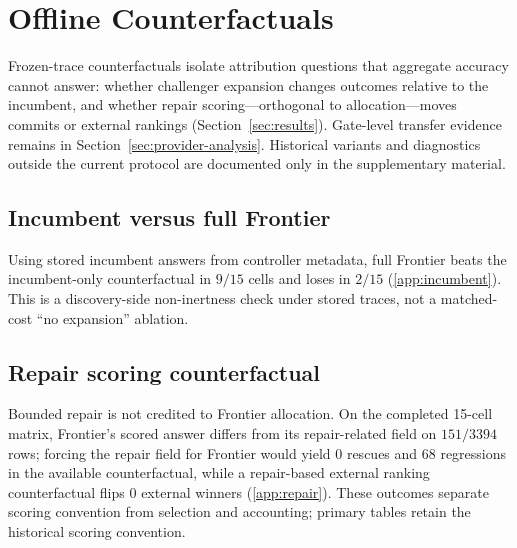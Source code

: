 \section{Offline Counterfactuals}
\label{sec:ablations}

Frozen-trace counterfactuals isolate attribution questions that aggregate accuracy cannot answer:
whether challenger expansion changes outcomes relative to the incumbent, and whether repair
scoring---orthogonal to allocation---moves commits or external rankings
(Section~\ref{sec:results}). Gate-level transfer evidence remains in
Section~\ref{sec:provider-analysis}. Historical variants and diagnostics outside the current
protocol are documented only in the supplementary material.

\subsection{Incumbent versus full Frontier}

Using stored incumbent answers from controller metadata, full Frontier beats the incumbent-only
counterfactual in $9/15$ cells and loses in $2/15$ (\ref{app:incumbent}). This is a
discovery-side non-inertness check under stored traces, not a matched-cost ``no expansion'' ablation.

\subsection{Repair scoring counterfactual}

Bounded repair is not credited to Frontier allocation. On the completed 15-cell matrix, Frontier's
scored answer differs from its repair-related field on $151/3394$ rows; forcing the repair field for
Frontier would yield 0 rescues and 68 regressions in the available counterfactual, while a
repair-based external ranking counterfactual flips 0 external winners (\ref{app:repair}).
These outcomes separate scoring convention from selection and accounting; primary tables retain the
historical scoring convention.
